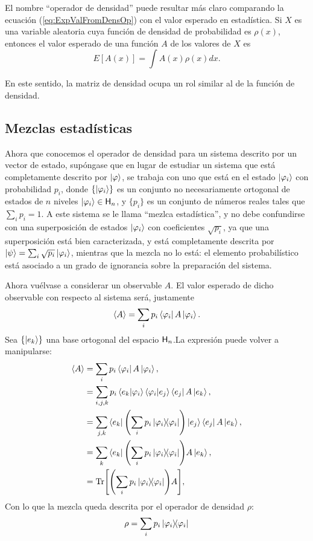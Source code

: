 El nombre ``operador de densidad'' puede resultar más claro comparando la ecuación (\ref{eq:ExpValFromDensOp}) con el valor esperado en estadística. Si $X$ es una variable aleatoria cuya función de densidad de probabilidad es $\rho(x)$, entonces el valor esperado de una función $A$ de los valores de $X$ es
\begin{equation*}
E[A(x)]=\int A(x) \rho(x) dx.
\end{equation*}

En este sentido, la matriz de densidad ocupa un rol similar al de la función de densidad.

\subsection{Mezclas estadísticas}

Ahora que conocemos el operador de densidad para un sistema descrito por un vector de estado, supóngase que en lugar de estudiar un sistema que está completamente descrito por $\ket{\varphi}$, se trabaja con uno que está en el estado $\ket{\varphi_{i}}$ con probabilidad $p_{i}$, donde $\{\ket{\varphi_{i}}\}$ es un conjunto no necesariamente ortogonal de estados de $n$ niveles $\ket{\varphi_{i}}\in{\sf H}_{n}$, y $\{p_{i}\}$ es un conjunto de números reales tales que $\sum_{i}p_{i}=1$. A este sistema se le llama ``mezlca estadística'', y no debe confundirse con una superposición de estados $\ket{\varphi_{i}}$ con coeficientes $\sqrt{p_{i}}$, ya que una superposición está bien caracterizada, y está completamente descrita por $\ket{\psi}=\sum_{i}\sqrt{p_{i}}\ket{\varphi_{i}}$, mientras que la mezcla no lo está: el elemento probabilístico está asociado a un grado de ignorancia sobre la preparación del sistema.

Ahora vuélvase a considerar un observable $A$. El valor esperado de dicho observable con respecto al sistema será, justamente
\begin{equation}
\expval{A}=\sum_{i}p_{i}\bra{\varphi_{i}}A\ket{\varphi_{i}}.
\end{equation}
Sea $\{\ket{e_{k}}\}$ una base ortogonal del espacio ${\sf H}_{n}$.La expresión puede volver a manipularse:
\begin{align*}
\expval{A}&=\sum_{i}p_{i}\bra{\varphi_{i}}A\ket{\varphi_{i}},\\
&=\sum_{i,j,k}p_{i}\bra{e_{k}}\ket{\varphi_{i}}\bra{\varphi_{i}}\ket{e_{j}} \bra{e_{j}}A\ket{e_{k}}, \\
&=\sum_{j,k}\bra{e_{k}}\qty(\sum_{i}p_{i}\dyad{\varphi_{i}})\ket{e_{j}} \bra{e_{j}}A\ket{e_{k}}, \\
&=\sum_{k}\bra{e_{k}}\qty(\sum_{i}p_{i}\dyad{\varphi_{i}})A\ket{e_{k}}, \\
&=\Tr[\qty(\sum_{i}p_{i}\dyad{\varphi_{i}})A], \\
\end{align*}
Con lo que la mezcla queda descrita por el operador de densidad $\rho$:
\begin{equation}\label{eq:DensOpMix}
\rho=\sum_{i}p_{i}\dyad{\varphi_{i}}
\end{equation}
